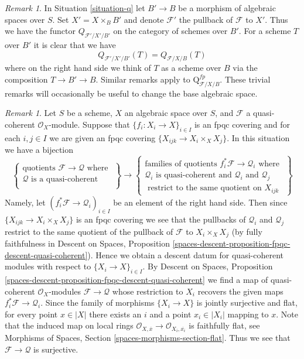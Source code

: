 \documentclass{stacks-project}
\theoremstyle{plain}
\theoremstyle{definition}
\theoremstyle{remark}
\newtheorem{remark}[subsection]{Remark}
\numberwithin{equation}{subsection}
\begin{document}
\begin{remark}
\label{remark-q-base-change}
In Situation \ref{situation-q} let $B' \to B$ be a morphism of
algebraic spaces over $S$. Set $X' = X \times_B B'$ and denote
$\mathcal{F}'$ the pullback of $\mathcal{F}$ to $X'$.
Thus we have the functor $Q_{\mathcal{F}'/X'/B'}$ on
the category of schemes over $B'$. For a scheme $T$ over $B'$
it is clear that we have
$$
Q_{\mathcal{F}'/X'/B'}(T) = Q_{\mathcal{F}/X/B}(T)
$$
where on the right hand side we think of $T$ as a scheme over $B$
via the composition $T \to B' \to B$.
Similar remarks apply to $\text{Q}^{fp}_{\mathcal{F}/X/B}$.
These trivial remarks
will occasionally be useful to change the base algebraic space.
\end{remark}

\begin{remark}
\label{remark-q-sheaf}
Let $S$ be a scheme, $X$ an algebraic space over $S$, and $\mathcal{F}$
a quasi-coherent $\mathcal{O}_X$-module. Suppose that
$\{f_i : X_i \to X\}_{i \in I}$
is an fpqc covering and for each $i, j \in I$ we are given an fpqc covering
$\{X_{ijk} \to X_i \times_X X_j\}$. In this situation we have a bijection
$$
\left\{
\begin{matrix}
\text{quotients }\mathcal{F} \to \mathcal{Q}\text{ where } \\
\mathcal{Q}\text{ is a quasi-coherent }\\
\end{matrix}
\right\}
\longrightarrow
\left\{
\begin{matrix}
\text{families of quotients }f_i^*\mathcal{F} \to \mathcal{Q}_i
\text{ where } \\
\mathcal{Q}_i\text{ is quasi-coherent and }
\mathcal{Q}_i\text{ and }\mathcal{Q}_j\\
\text{ restrict to the same quotient on }X_{ijk}
\end{matrix}
\right\}
$$
Namely, let $(f_i^*\mathcal{F} \to \mathcal{Q}_i)_{i \in I}$
be an element of the right hand side. Then since
$\{X_{ijk} \to X_i \times_X X_j\}$ is an fpqc covering we see that
the pullbacks of $\mathcal{Q}_i$ and $\mathcal{Q}_j$ restrict
to the same quotient of the pullback of $\mathcal{F}$ to $X_i \times_X X_j$
(by fully faithfulness in
Descent on Spaces, Proposition
\ref{spaces-descent-proposition-fpqc-descent-quasi-coherent}).
Hence we obtain a descent datum for quasi-coherent modules
with respect to $\{X_i \to X\}_{i \in I}$. By
Descent on Spaces, Proposition
\ref{spaces-descent-proposition-fpqc-descent-quasi-coherent}
we find a map of quasi-coherent $\mathcal{O}_X$-modules
$\mathcal{F} \to \mathcal{Q}$ whose restriction to $X_i$ recovers
the given maps $f_i^*\mathcal{F} \to \mathcal{Q}_i$.
Since the family of morphisms $\{X_i \to X\}$ is jointly surjective
and flat, for every point $x \in |X|$ there exists an $i$ and a point
$x_i \in |X_i|$ mapping to $x$. Note that the induced map on
local rings
$\mathcal{O}_{X, \overline{x}} \to \mathcal{O}_{X_i, \overline{x_i}}$
is faithfully flat, see
Morphisms of Spaces, Section \ref{spaces-morphisms-section-flat}.
Thus we see that $\mathcal{F} \to \mathcal{Q}$ is surjective.
\end{remark}
\end{document}
